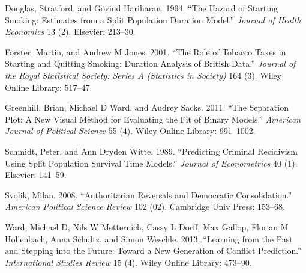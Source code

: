 \documentclass[]{article}
\begin{document}
Douglas, Stratford, and Govind Hariharan. 1994. ``The Hazard of Starting
Smoking: Estimates from a Split Population Duration Model.''
\emph{Journal of Health Economics} 13 (2). Elsevier: 213--30.

Forster, Martin, and Andrew M Jones. 2001. ``The Role of Tobacco Taxes
in Starting and Quitting Smoking: Duration Analysis of British Data.''
\emph{Journal of the Royal Statistical Society: Series A (Statistics in
Society)} 164 (3). Wiley Online Library: 517--47.

Greenhill, Brian, Michael D Ward, and Audrey Sacks. 2011. ``The
Separation Plot: A New Visual Method for Evaluating the Fit of Binary
Models.'' \emph{American Journal of Political Science} 55 (4). Wiley
Online Library: 991--1002.

Schmidt, Peter, and Ann Dryden Witte. 1989. ``Predicting Criminal
Recidivism Using Split Population Survival Time Models.'' \emph{Journal
of Econometrics} 40 (1). Elsevier: 141--59.

Svolik, Milan. 2008. ``Authoritarian Reversals and Democratic
Consolidation.'' \emph{American Political Science Review} 102 (02).
Cambridge Univ Press: 153--68.

Ward, Michael D, Nils W Metternich, Cassy L Dorff, Max Gallop, Florian M
Hollenbach, Anna Schultz, and Simon Weschle. 2013. ``Learning from the
Past and Stepping into the Future: Toward a New Generation of Conflict
Prediction.'' \emph{International Studies Review} 15 (4). Wiley Online
Library: 473--90.
\end{document}
